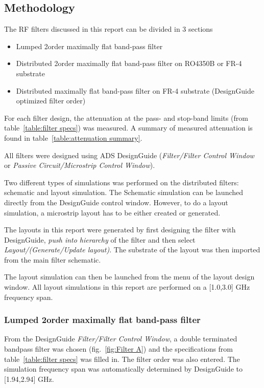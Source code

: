\documentclass[report.tex]{subfiles}
\begin{document}
\subsection{Methodology}
The RF filters discussed in this report can be divided in 3 sections
\begin{itemize}
    \item Lumped 2\nd order maximally flat band-pass filter
    \item Distributed 2\nd order maximally flat band-pass filter on RO4350B or FR-4 substrate
    \item Distributed maximally flat band-pass filter on FR-4 substrate (DesignGuide optimized filter order)
\end{itemize}
For each filter design, the attenuation at the pass- and stop-band limits (from table~\ref{table:filter specs}) was measured. A summary of measured attenuation is found in table~\ref{table:attenuation summary}.

All filters were designed using ADS DesignGuide (\emph{Filter/Filter Control Window} or \emph{Passive Circuit/Microstrip Control Window}).

Two different types of simulations was performed on the distributed filters: schematic and layout simulation. The Schematic simulation can be launched directly from the DesignGuide control window. However, to do a layout simulation, a microstrip layout has to be either created or generated.

The layouts in this report were generated by first designing the filter with DesignGuide, \emph{push into hierarchy} of the filter and then select \emph{Layout/(Generate/Update layout)}. The substrate of the layout was then imported from the main filter schematic.

The layout simulation can then be launched from the menu of the layout design window. All layout simulations in this report are performed on a [1.0,3.0] GHz frequency span.

\subsubsection{Lumped 2\nd order maximally flat band-pass filter}
From the DesignGuide \emph{Filter/Filter Control Window}, a double terminated bandpass filter was chosen (fig.~\ref{fig:Filter A}) and the specifications from table~\ref{table:filter specs} was filled in. The filter order was also entered. The simulation frequency span was automatically determined by DesignGuide to [1.94,2.94] GHz.
\end{document}
